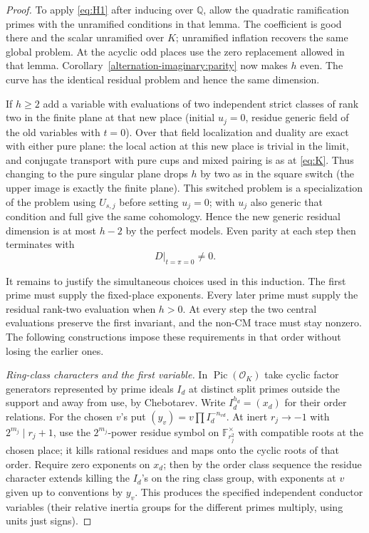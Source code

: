 \begin{proof}
To apply \eqref{eq:H1} after inducing over \(\mathbb Q\), allow the
quadratic ramification primes with the unramified conditions in that
lemma. The coefficient is good there and the scalar unramified over
\(K\); unramified inflation recovers the same global problem. At the
acyclic odd places use the zero replacement allowed in that lemma.
Corollary~\ref{alternation-imaginary:parity} now makes \(h\) even. The
curve has the identical residual problem and hence the same dimension.

If \(h\ge2\) add a variable with evaluations of two independent strict classes of rank two in the finite plane at that new place (initial \(u_j=0\), residue generic field of the old variables with \(t=0\)). Over that field localization and duality are exact with either pure plane: the local action at this new place is trivial in the limit, and conjugate transport with pure cups and mixed pairing is as at \eqref{eq:K}. Thus changing to the pure singular plane drops \(h\) by two as in the square switch (the upper image is exactly the finite plane). This switched problem is a specialization of the problem using \(U_{s,j}\) before setting \(u_j=0\); with \(u_j\) also generic that condition and full give the same cohomology. Hence the new generic residual dimension is at most \(h-2\) by the perfect models. Even parity at each step then terminates with
\[
                              D|_{t=\pi=0}\ne0.
\]

It remains to justify the simultaneous choices used in this induction.
The first prime must supply the fixed-place exponents. Every later prime
must supply the residual rank-two evaluation when \(h>0\). At every
step the two central evaluations preserve the first invariant, and the
non-CM trace must stay nonzero. The following constructions impose these
requirements in that order without losing the earlier ones.

\emph{Ring-class characters and the first variable.} In \(\operatorname{Pic}(\mathcal O_K)\) take cyclic factor generators represented by prime ideals \(I_d\) at distinct split primes outside the support and away from use, by Chebotarev. Write \(I_d^{h_d}=(x_d)\) for their order relations. For the chosen \(v\)'s put \((y_v)=v\prod I_d^{-n_{vd}}\). At inert \(r_j\to-1\) with \(2^{m_j}\mid r_j+1\), use the \(2^{m_j}\)-power residue symbol on \(\mathbb F_{r_j^2}^\times\) with compatible roots at the chosen place; it kills rational residues and maps onto the cyclic roots of that order. Require zero exponents on \(x_d\); then by the order class sequence the residue character extends killing the \(I_d\)'s on the ring class group, with exponents at \(v\) given up to conventions by \(y_v\). This produces the specified independent conductor variables (their relative inertia groups for the different primes multiply, using units just signs).


\end{proof}

